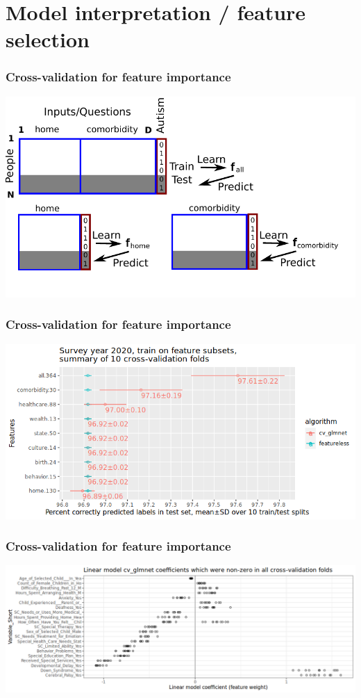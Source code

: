 \documentclass{beamer}
\begin{document}
\section{Model interpretation / feature selection}

\begin{frame}
  \frametitle{Cross-validation for feature importance}
  \includegraphics[width=\textwidth]{drawing-cv-feature-sets.pdf}
\end{frame}

\begin{frame}
  \frametitle{Cross-validation for feature importance}
  \includegraphics[width=\textwidth]{download-nsch-mlr3batchmark-registry-one-set-compare-features.png}
\end{frame}

\begin{frame}
  \frametitle{Cross-validation for feature importance}
  \includegraphics[width=\textwidth]{download-nsch-mlr3batchmark-registry-glmnet-coef-all.png}
\end{frame}
\end{document}
